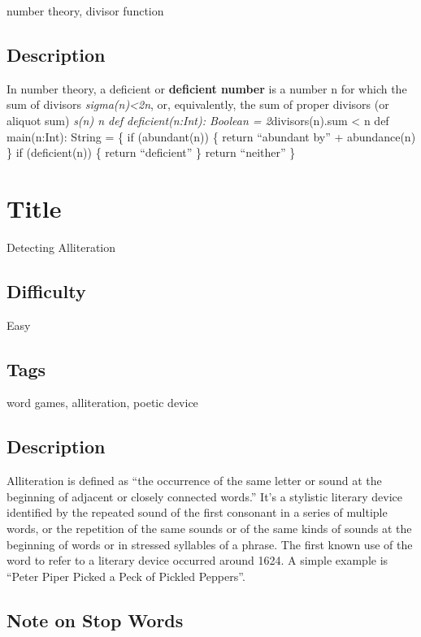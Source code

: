 number theory, divisor function

\subsection{Description}\label{description-12}

In number theory, a deficient or \textbf{deficient number} is a number n
for which the sum of divisors \emph{sigma(n)\textless{}2n}, or,
equivalently, the sum of proper divisors (or aliquot sum) \emph{s(n) n
def deficient(n:Int): Boolean = 2}divisors(n).sum \textless{} n def
main(n:Int): String = \{ if (abundant(n)) \{ return ``abundant by'' +
abundance(n) \} if (deficient(n)) \{ return ``deficient'' \} return
``neither'' \}

\section{Title}\label{title-13}

Detecting Alliteration

\subsection{Difficulty}\label{difficulty-12}

Easy

\subsection{Tags}\label{tags-13}

word games, alliteration, poetic device

\subsection{Description}\label{description-13}

Alliteration is defined as ``the occurrence of the same letter or sound
at the beginning of adjacent or closely connected words.'' It's a
stylistic literary device identified by the repeated sound of the first
consonant in a series of multiple words, or the repetition of the same
sounds or of the same kinds of sounds at the beginning of words or in
stressed syllables of a phrase. The first known use of the word to refer
to a literary device occurred around 1624. A simple example is ``Peter
Piper Picked a Peck of Pickled Peppers''.

\subsection{Note on Stop Words}\label{note-on-stop-words}

